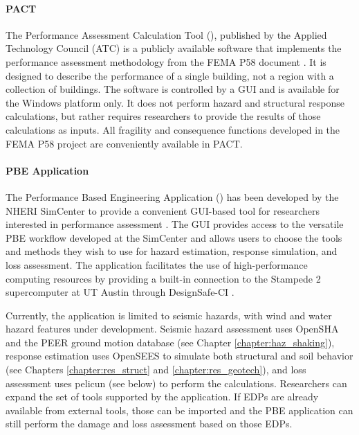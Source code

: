 \paragraph{PACT} The Performance Assessment Calculation Tool (), published by the Applied Technology Council (ATC) is a publicly available software that implements the performance assessment methodology from the FEMA P58 document \citep{atc2018p-58-2}. It is designed to describe the performance of a single building, not a region with a collection of buildings. The software is controlled by a GUI and is available for the Windows platform only. It does not perform hazard and structural response calculations, but rather requires researchers to provide the results of those calculations as inputs. All fragility and consequence functions developed in the FEMA P58 project are conveniently available in PACT.

\paragraph{PBE Application} The Performance Based Engineering Application () has been developed by the NHERI SimCenter to provide a convenient GUI-based tool for researchers interested in performance assessment \citep{zsarnoczay2019PBE}. The GUI provides access to the versatile PBE workflow developed at the SimCenter and allows users to choose the tools and methods they wish to use for hazard estimation, response simulation, and loss assessment. The application facilitates the use of high-performance computing resources by providing a built-in connection to the Stampede 2 supercomputer at UT Austin through DesignSafe-CI \citep{rathje2017designsafe}.

Currently, the application is limited to seismic hazards, with wind and water hazard features under development. Seismic hazard assessment uses OpenSHA and the PEER ground motion database (see Chapter \ref{chapter:haz_shaking}), response estimation uses OpenSEES to simulate both structural and soil behavior (see Chapters \ref{chapter:res_struct} and \ref{chapter:res_geotech}), and loss assessment uses pelicun (see below) to perform the calculations. Researchers can expand the set of tools supported by the application. If EDPs are already available from external tools, those can be imported and the PBE application can still perform the damage and loss assessment based on those EDPs.

